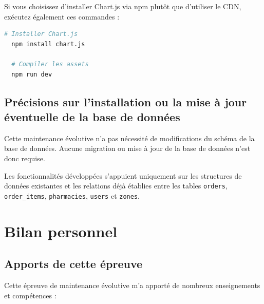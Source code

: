 \documentclass[a4paper,12pt]{report}
\begin{document}
  Si vous choisissez d'installer Chart.js via npm plutôt que d'utiliser le CDN, exécutez également ces commandes :
  
  \begin{lstlisting}[language=bash]
  # Installer Chart.js
  npm install chart.js
  
  # Compiler les assets
  npm run dev
  \end{lstlisting}

  \subsection{Précisions sur l'installation ou la mise à jour éventuelle de la base de données}
  Cette maintenance évolutive n'a pas nécessité de modifications du schéma de la base de données. Aucune migration ou mise à jour de la base de données n'est donc requise.
  
  Les fonctionnalités développées s'appuient uniquement sur les structures de données existantes et les relations déjà établies entre les tables \texttt{orders}, \texttt{order\_items}, \texttt{pharmacies}, \texttt{users} et \texttt{zones}.

\section{Bilan personnel}
  \subsection{Apports de cette épreuve}
  Cette épreuve de maintenance évolutive m'a apporté de nombreux enseignements et compétences :
  
\end{document}
